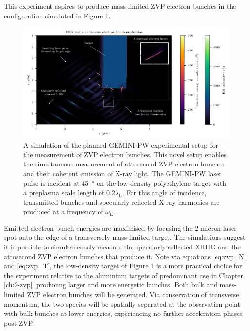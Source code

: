 This experiment aspires to produce mass-limited ZVP electron bunches in the configuration simulated in Figure \ref{fig:experimentsetuphhgbunches2}. %
\begin{figure}
	\centering
	\includegraphics[width=1\linewidth]{figures/zvp/Experiment_setup_HHG_bunches2}
	\caption[Planned GEMINI-PW experimental setup for the measurement of ZVP electron bunches.]{A simulation of the planned GEMINI-PW experimental setup for the measurement of ZVP electron bunches. This novel setup enables the simultaneous measurement of attosecond ZVP electron bunches and their coherent emission of X-ray light. The GEMINI-PW laser pulse is incident at \qty{45}{\degree} on the low-density polyethylene target with a preplasma scale length of $0.2\lambda_\mathrm{L}$. For this angle of incidence, transmitted bunches and specularly reflected X-ray harmonics are produced at a frequency of $\omega_\mathrm{L}$.}
	\label{fig:experimentsetuphhgbunches2}
\end{figure}
Emitted electron bunch energies are maximised by focusing the 2 micron laser spot onto the edge of a transversely mass-limited target. The simulations suggest it is possible to simultaneously measure the specularly reflected \ac{XHHG} and the attosecond ZVP electron bunches that produce it. Note via equations \ref{eq:zvp_N} and \ref{eq:zvp_T}, the low-density target of Figure \ref{fig:experimentsetuphhgbunches2} is a more practical choice for the experiment relative to the aluminium targets of predominant use in Chapter \ref{ch:2-zvp}, producing larger and more energetic bunches. Both bulk and mass-limited ZVP electron bunches will be generated. Via conservation of transverse momentum, the two species will be spatially separated at the observation point with bulk bunches at lower energies, experiencing no further acceleration phases post-ZVP.

